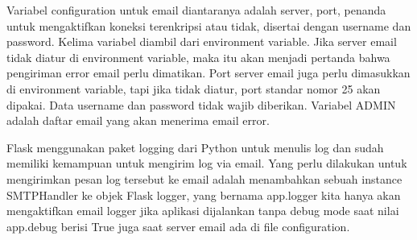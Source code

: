 Variabel configuration untuk email diantaranya adalah server, port, penanda untuk mengaktifkan koneksi terenkripsi atau tidak, disertai dengan username dan password. Kelima variabel diambil dari environment variable. Jika server email tidak diatur di environment variable, maka itu akan menjadi pertanda bahwa pengiriman error email perlu dimatikan. Port server email juga perlu dimasukkan di environment variable, tapi jika tidak diatur, port standar nomor 25 akan dipakai. Data username dan password tidak wajib diberikan. Variabel ADMIN adalah daftar email yang akan menerima email error.

Flask menggunakan paket logging dari Python untuk menulis log dan  sudah memiliki kemampuan untuk mengirim log via email. Yang perlu dilakukan untuk mengirimkan pesan log tersebut ke email adalah menambahkan sebuah instance SMTPHandler ke objek Flask logger, yang bernama app.logger  kita hanya akan mengaktifkan email logger jika aplikasi dijalankan tanpa debug mode saat nilai app.debug berisi True juga saat server email ada di file configuration.
